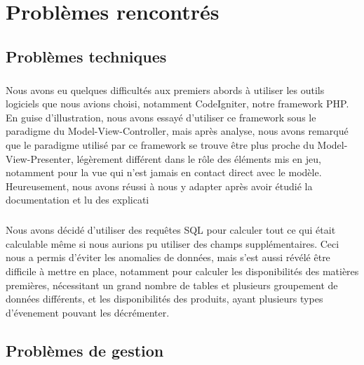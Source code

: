 \chapter{Problèmes rencontrés}


\section{Problèmes techniques}
    \paragraph{}
        Nous avons eu quelques difficultés aux premiers abords à utiliser les 
        outils logiciels que nous avions choisi, notamment CodeIgniter, notre
        framework PHP.
        En guise d'illustration, nous avons essayé d'utiliser ce framework 
        sous le paradigme du Model-View-Controller, mais après analyse,
        nous avons remarqué que le paradigme utilisé par ce framework
        se trouve être plus proche du
        Model-View-Presenter, légèrement différent dans le rôle
        des éléments mis en jeu, notamment pour la vue qui n'est
        jamais en contact direct avec le modèle.
        Heureusement, nous avons réussi à nous y adapter après avoir étudié
        la documentation et lu des explicati

    \paragraph{}
        Nous avons décidé d'utiliser des requêtes SQL pour calculer tout ce qui
        était calculable même si nous aurions pu utiliser des champs
        supplémentaires.
        Ceci nous a permis d'éviter les anomalies de données, mais s'est aussi
        révélé être difficile à mettre en place, notamment pour calculer les 
        disponibilités des matières premières, nécessitant un grand nombre de 
        tables et plusieurs groupement de données différents, et les
        disponibilités des produits, ayant plusieurs types d'évenement pouvant
        les décrémenter.
        
\section{Problèmes de gestion}
